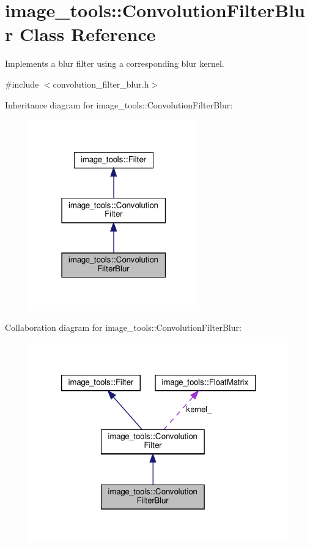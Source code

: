 \hypertarget{classimage__tools_1_1ConvolutionFilterBlur}{}\section{image\+\_\+tools\+:\+:Convolution\+Filter\+Blur Class Reference}
\label{classimage__tools_1_1ConvolutionFilterBlur}


Implements a blur filter using a corresponding blur kernel.  




{\ttfamily \#include $<$convolution\+\_\+filter\+\_\+blur.\+h$>$}



Inheritance diagram for image\+\_\+tools\+:\+:Convolution\+Filter\+Blur\+:
\nopagebreak
\begin{figure}[H]
\begin{center}
\leavevmode
\includegraphics[width=207pt]{classimage__tools_1_1ConvolutionFilterBlur__inherit__graph}
\end{center}
\end{figure}


Collaboration diagram for image\+\_\+tools\+:\+:Convolution\+Filter\+Blur\+:
\nopagebreak
\begin{figure}[H]
\begin{center}
\leavevmode
\includegraphics[width=320pt]{classimage__tools_1_1ConvolutionFilterBlur__coll__graph}
\end{center}
\end{figure}
